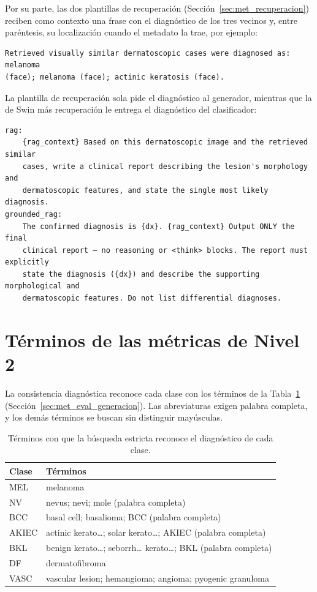 Por su parte, las dos plantillas de recuperación (Sección~\ref{sec:met_recuperacion}) reciben como contexto una frase
con el diagnóstico de los tres vecinos y, entre paréntesis, su localización cuando el metadato la trae, por
ejemplo:
\begin{verbatim}
Retrieved visually similar dermatoscopic cases were diagnosed as: melanoma
(face); melanoma (face); actinic keratosis (face).
\end{verbatim}
La plantilla de recuperación sola pide el diagnóstico al generador, mientras que la de Swin más recuperación
le entrega el diagnóstico del clasificador:
\begin{verbatim}
rag:
    {rag_context} Based on this dermatoscopic image and the retrieved similar
    cases, write a clinical report describing the lesion's morphology and
    dermatoscopic features, and state the single most likely diagnosis.
grounded_rag:
    The confirmed diagnosis is {dx}. {rag_context} Output ONLY the final
    clinical report — no reasoning or <think> blocks. The report must explicitly
    state the diagnosis ({dx}) and describe the supporting morphological and
    dermatoscopic features. Do not list differential diagnoses.
\end{verbatim}

\section{Términos de las métricas de Nivel 2}

La consistencia diagnóstica reconoce cada clase con los términos de la Tabla~\ref{tab:ap_terminos_dx}
(Sección~\ref{sec:met_eval_generacion}). Las abreviaturas exigen palabra completa, y los demás términos se
buscan sin distinguir mayúsculas.

\begin{table}[H]
    \centering
    \caption{Términos con que la búsqueda estricta reconoce el diagnóstico de cada clase.}
    \label{tab:ap_terminos_dx}
    \small
    \begin{tabularx}{\textwidth}{@{}>{\raggedright\arraybackslash}p{2.2cm}>{\raggedright\arraybackslash}X@{}}
        \toprule
        \textbf{Clase} & \textbf{Términos} \\
        \midrule
        MEL & melanoma \\
        \filasep
        NV & nevus; nevi; mole (palabra completa) \\
        \filasep
        BCC & basal cell; basalioma; BCC (palabra completa) \\
        \filasep
        AKIEC & actinic kerato…; solar kerato…; AKIEC (palabra completa) \\
        \filasep
        BKL & benign kerato…; seborrh… kerato…; BKL (palabra completa) \\
        \filasep
        DF & dermatofibroma \\
        \filasep
        VASC & vascular lesion; hemangioma; angioma; pyogenic granuloma \\
        \bottomrule
    \end{tabularx}
\end{table}

